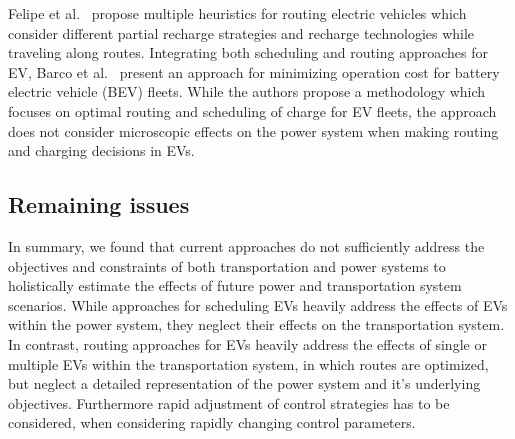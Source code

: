 Felipe et al.~\cite{felipe2014heuristic} propose multiple heuristics for routing electric vehicles which consider different partial recharge strategies and recharge technologies while traveling along routes. 
Integrating both scheduling and routing approaches for EV, Barco et al.~\cite{barco2013optimal} present an approach for minimizing operation cost for battery electric vehicle (BEV) fleets. While the authors propose a methodology which focuses on optimal routing and scheduling of charge for EV fleets, the approach does not consider microscopic effects on the power system when making routing and charging decisions in EVs.

\subsection{Remaining issues}
\label{problems}

In summary, we found that current approaches do not sufficiently address the objectives and constraints of both transportation and power systems to holistically estimate the effects of future power and transportation system scenarios. While approaches for scheduling EVs heavily address the effects of EVs within the power system, they neglect their effects on the transportation system. In contrast, routing approaches for EVs heavily address the effects of single or multiple EVs within the transportation system, in which routes are optimized, but neglect a detailed representation of the power system and it's underlying objectives. Furthermore rapid adjustment of control strategies has to be considered, when considering rapidly changing control parameters.


